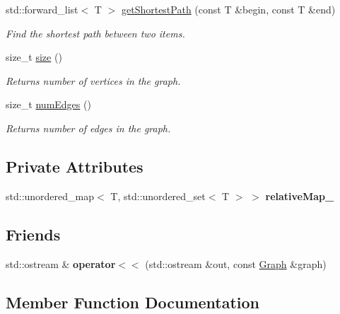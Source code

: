\begin{DoxyCompactItemize}
std\+::forward\+\_\+list$<$ T $>$ \hyperlink{class_graph_a30e9323548d265416291e975cfed93db}{get\+Shortest\+Path} (const T \&begin, const T \&end)
\begin{DoxyCompactList}\small\item\em Find the shortest path between two items. \end{DoxyCompactList}\item 
size\+\_\+t \hyperlink{class_graph_a98ac5dfc305ed0e31b6bb160503151ba}{size} ()
\begin{DoxyCompactList}\small\item\em Returns number of vertices in the graph. \end{DoxyCompactList}\item 
size\+\_\+t \hyperlink{class_graph_a5548064ddb3dfa56bb32347ee47f98dd}{num\+Edges} ()
\begin{DoxyCompactList}\small\item\em Returns number of edges in the graph. \end{DoxyCompactList}\end{DoxyCompactItemize}
\subsection*{Private Attributes}
\begin{DoxyCompactItemize}
\item 
\mbox{\label{class_graph_a949a8e9a754adedac0e83bce9e97d392}} 
std\+::unordered\+\_\+map$<$ T, std\+::unordered\+\_\+set$<$ T $>$ $>$ {\bfseries relative\+Map\+\_\+}
\end{DoxyCompactItemize}
\subsection*{Friends}
\begin{DoxyCompactItemize}
\item 
\mbox{\label{class_graph_a8c95b2eba4c48f2610a84160fa6871f2}} 
std\+::ostream \& {\bfseries operator$<$$<$} (std\+::ostream \&out, const \hyperlink{class_graph}{Graph} \&graph)
\end{DoxyCompactItemize}


\subsection{Member Function Documentation}
\mbox{\label{class_graph_ae68a4a6bcb5dacf54f389ec9f28eb9e7}} 

